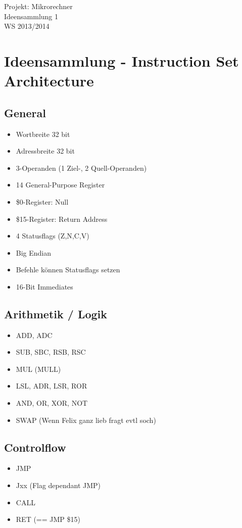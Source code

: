 \documentclass[a4paper]{article}
\newcommand{\titelblock}{
\sloppy
\begin{center}
\sffamily
{\Large{\veranstaltung \\}}
{\Huge{\doctitle  \nummer}\\}
\vspace{0.5cm}
\tutorium \\
\hrulefill
\end{center}
}
\newcommand{\doctitle}{Ideensammlung}
\newcommand{\nummer}{ 1} %
\newcommand{\tutorium}{WS 2013/2014}
\newcommand{\veranstaltung}{Projekt: Mikrorechner}
\begin{document}
\titelblock

\section{Ideensammlung - Instruction Set Architecture}

\subsection{General}

\begin{multicols}{2}
\begin{itemize}

\item Wortbreite 32 bit
\item Adressbreite 32 bit
\item 3-Operanden (1 Ziel-, 2 Quell-Operanden)
\item 14 General-Purpose Register
\item \$0-Register: Null
\item \$15-Register: Return Address
\item 4 Statusflags (Z,N,C,V)
\item Big Endian
\item Befehle können Statusflags setzen
\item 16-Bit Immediates

\end{itemize}

\subsection{Arithmetik / Logik}

\begin{itemize}
\item ADD, ADC
\item SUB, SBC, RSB, RSC
\item MUL (MULL)
\item LSL, ADR, LSR, ROR 
\item AND, OR, XOR, NOT
\item SWAP (Wenn Felix ganz lieb fragt evtl soch)
\end{itemize}

\subsection{Controlflow}

\begin{itemize}
\item JMP
\item Jxx (Flag dependant JMP)
\item CALL
\item RET (== JMP \$15)
\end{itemize}


\end{multicols}
\end{document}
